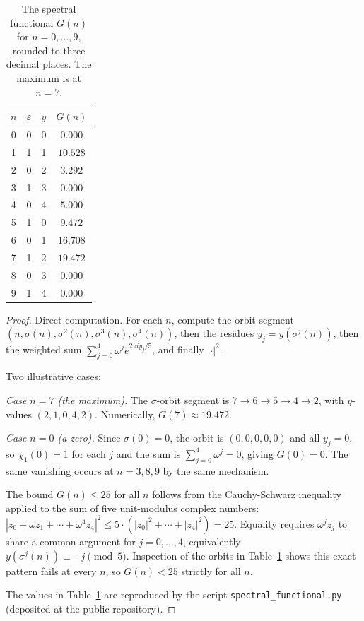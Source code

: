 \documentclass[11pt,reqno]{amsart}
\theoremstyle{definition}
\begin{document}
\begin{table}[h]
\caption{The spectral functional $G(n)$ for $n = 0, \ldots, 9$,
rounded to three decimal places. The maximum is at $n = 7$.}
\label{tab:Gvalues}
\begin{center}
\begin{tabular}{|c|c|c|c|}
\hline
$n$ & $\varepsilon$ & $y$ & $G(n)$ \\
\hline
0 & 0 & 0 & $0.000$ \\
1 & 1 & 1 & $10.528$ \\
2 & 0 & 2 & $3.292$ \\
3 & 1 & 3 & $0.000$ \\
4 & 0 & 4 & $5.000$ \\
5 & 1 & 0 & $9.472$ \\
6 & 0 & 1 & $16.708$ \\
7 & 1 & 2 & $\mathbf{19.472}$ \\
8 & 0 & 3 & $0.000$ \\
9 & 1 & 4 & $0.000$ \\
\hline
\end{tabular}
\end{center}
\end{table}

\begin{proof}
Direct computation. For each $n$, compute the orbit segment
$(n, \sigma(n), \sigma^{2}(n), \sigma^{3}(n), \sigma^{4}(n))$,
then the residues $y_{j} = y(\sigma^{j}(n))$, then the
weighted sum $\sum_{j=0}^{4} \omega^{j} e^{2\pi i y_{j}/5}$, and
finally $|\cdot|^{2}$.

Two illustrative cases:

\textit{Case $n = 7$ (the maximum).} The $\sigma$-orbit segment
is $7 \to 6 \to 5 \to 4 \to 2$, with $y$-values $(2, 1, 0, 4, 2)$.
Numerically, $G(7) \approx 19.472$.

\textit{Case $n = 0$ (a zero).} Since $\sigma(0) = 0$, the orbit
is $(0, 0, 0, 0, 0)$ and all $y_{j} = 0$, so $\chi_{1}(0) = 1$
for each $j$ and the sum is $\sum_{j=0}^{4} \omega^{j} = 0$,
giving $G(0) = 0$. The same vanishing occurs at $n = 3, 8, 9$ by
the same mechanism.

The bound $G(n) \le 25$ for all $n$ follows from the
Cauchy-Schwarz inequality applied to the sum of five unit-modulus
complex numbers: $|z_{0} + \omega z_{1} + \cdots + \omega^{4}
z_{4}|^{2} \le 5 \cdot (|z_{0}|^{2} + \cdots + |z_{4}|^{2}) = 25$.
Equality requires $\omega^{j} z_{j}$ to share a common argument
for $j = 0, \ldots, 4$, equivalently $y(\sigma^{j}(n)) \equiv -j
\pmod{5}$. Inspection of the orbits in Table~\ref{tab:Gvalues}
shows this exact pattern fails at every $n$, so $G(n) < 25$
strictly for all $n$.

The values in Table~\ref{tab:Gvalues} are reproduced by the
script \texttt{spectral\_functional.py} (deposited at the public
repository).
\end{proof}
\end{document}
